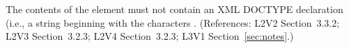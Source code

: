The contents of the  element must not contain an XML
DOCTYPE declaration (i.e., a string beginning with the characters
.  (References: L2V2 Section~3.3.2;
L2V3 Section~3.2.3; L2V4 Section~3.2.3; L3V1 Section~\ref{sec:notes}.)
